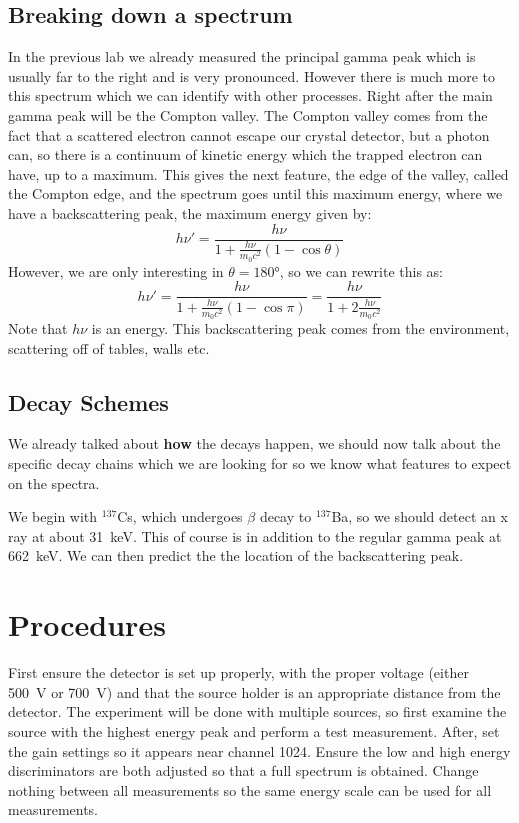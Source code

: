 \documentclass[letterpaper,12pt]{article}
\begin{document}
\subsection{Breaking down a spectrum}
In the previous lab we already measured the principal gamma peak which is usually far to the right and is very pronounced. However there is much more to this spectrum which we can identify with other processes. Right after the main gamma peak will be the Compton valley. The Compton valley comes from the fact that a scattered electron cannot escape our crystal detector, but a photon can, so there is a continuum of kinetic energy which the trapped electron can have, up to a maximum. This gives the next feature, the edge of the valley, called the Compton edge, and the spectrum goes until this maximum energy, where we have a backscattering peak, the maximum energy given by:
\begin{equation*}
  h\nu'=\frac{h\nu}{1+\frac{h\nu}{m_0c^2}(1-\cos\theta)}
\end{equation*}
However, we are only interesting in $\theta=\ang{180}$, so we can rewrite this as:
\begin{equation}
  \label{eq:back}
  h\nu'=\frac{h\nu}{1+\frac{h\nu}{m_0c^2}(1-\cos\pi)}=
  \boxed{\frac{h\nu}{1+2\frac{h\nu}{m_0c^2}}}
\end{equation}
Note that $h\nu$ is an energy. This backscattering peak comes from the environment, scattering off of tables, walls etc.

\subsection{Decay Schemes}
We already talked about \textbf{how} the decays happen, we should now talk about the specific decay chains which we are looking for so we know what features to expect on the spectra.

We begin with $^{137}$Cs, which undergoes $\beta$ decay to $^{137}$Ba, so we should detect an x ray at about \SI{31}{\kilo\eV}. This of course is in addition to the regular gamma peak at \SI{662}{\kilo\eV}. We can then predict the the location of the backscattering peak.


\section{Procedures}
First ensure the detector is set up properly, with the proper voltage (either \SI{500}{\V} or \SI{700}{\V}) and that the source holder is an appropriate distance from the detector. The experiment will be done with multiple sources, so first examine the source with the highest energy peak and perform a test measurement. After, set the gain settings so it appears near channel 1024. Ensure the low and high energy discriminators are both adjusted so that a full spectrum is obtained. Change nothing between all measurements so the same energy scale can be used for all measurements.
\end{document}
